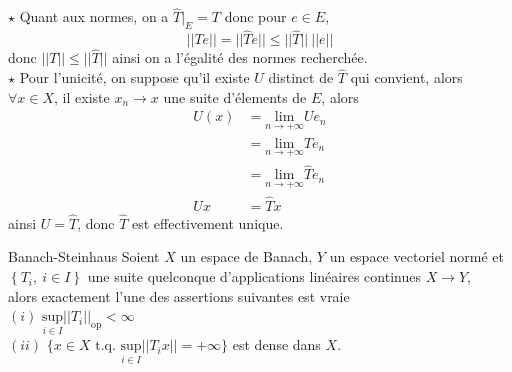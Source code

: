 \documentclass[a4paper,11pt, twoside]{article}
\begin{document}
\begin{Proof}
  $\star$ Quant aux normes, on a $\hat T\big|_E=T$ donc pour $e\in E$,
  $$||Te||=||\hat Te||\leqslant ||\hat T||\ ||e||$$
  donc $||T||\leqslant||\hat T||$ ainsi on a l'égalité des normes recherchée.\\

  $\star$ Pour l'unicité, on suppose qu'il existe $U$ distinct de $\hat T$ qui convient, alors $\forall x\in X$, il existe $x_n\longrightarrow x$ une suite d'élements  de $E$, alors
  \begin{align*}
    U(x)&=\underset{n\to+\infty}{\mathrm{lim}} Ue_n\\
    &=\underset{n\to+\infty}{\mathrm{lim}}Te_n\\
    &=\underset{n\to+\infty}{\mathrm{lim}}\hat Te_n\\
    Ux&=\hat Tx
  \end{align*}
  ainsi $U=\hat T$, donc $\hat T$ est effectivement unique.
\end{Proof}


\begin{thC}{Banach-Steinhaus}
  Soient $X$ un espace de Banach, $Y$ un espace vectoriel normé et $\left\{T_i,\ i\in I\right\}$ une suite quelconque d'applications linéaires continues $X\longrightarrow Y$,\\
  
  alors exactement l'une des assertions suivantes est vraie\\
  $(i)$ $\underset{i\in I}{\mathrm{sup}}||T_i||_{\mathrm{op}}<\infty$\\[1em]
  $(ii) $ $\Big\{x\in X\text{ t.q. } \underset{i\in I}{\mathrm{sup}}||T_ix||=+\infty\Big\}$ est dense dans $X$.
\end{thC}
\end{document}

